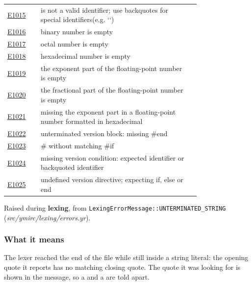 \begin{longtable}{@{}l p{0.78\linewidth} r@{}}
\hyperref[sec:codes:e1015]{E1015} & \errhole{} is not a valid identifier; use backquotes for special identifiers(e.g. `\errhole{}`) & \pageref{sec:codes:e1015}\\
\hyperref[sec:codes:e1016]{E1016} & binary number is empty & \pageref{sec:codes:e1016}\\
\hyperref[sec:codes:e1017]{E1017} & octal number is empty & \pageref{sec:codes:e1017}\\
\hyperref[sec:codes:e1018]{E1018} & hexadecimal number is empty & \pageref{sec:codes:e1018}\\
\hyperref[sec:codes:e1019]{E1019} & the exponent part of the floating-point number is empty & \pageref{sec:codes:e1019}\\
\hyperref[sec:codes:e1020]{E1020} & the fractional part of the floating-point number is empty & \pageref{sec:codes:e1020}\\
\hyperref[sec:codes:e1021]{E1021} & missing the exponent part in a floating-point number formatted in hexadecimal & \pageref{sec:codes:e1021}\\
\hyperref[sec:codes:e1022]{E1022} & unterminated version block: missing \#end & \pageref{sec:codes:e1022}\\
\hyperref[sec:codes:e1023]{E1023} & \#\errhole{} without matching \#if & \pageref{sec:codes:e1023}\\
\hyperref[sec:codes:e1024]{E1024} & missing version condition: expected identifier or backquoted identifier & \pageref{sec:codes:e1024}\\
\hyperref[sec:codes:e1025]{E1025} & undefined version directive; expecting if, else or end & \pageref{sec:codes:e1025}\\
\bottomrule
\end{longtable}

\label{sec:codes:e1001}

Raised during \textbf{lexing}, from \texttt{LexingErrorMessage::\allowbreak{}UNTERMINATED\_\allowbreak{}STRING} (\textit{src/\allowbreak{}ymirc/\allowbreak{}lexing/\allowbreak{}errors.yr}).

\subsubsection*{What it means}

The lexer reached the end of the file while still inside a string literal: the opening quote it reports has no matching closing quote. The quote it was looking for is shown in the message, so a  and a  are told apart.

